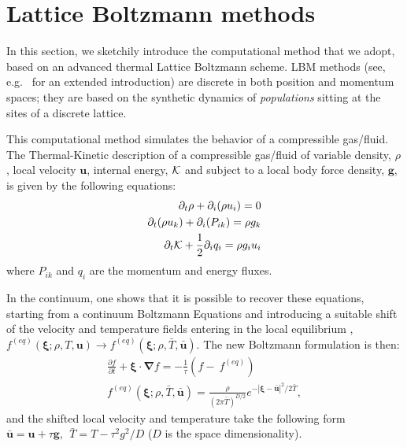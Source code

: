 \documentclass{elsarticle}
\newcommand{\T}{T}
\begin{document}

\section{Lattice Boltzmann methods}

In this section, we sketchily introduce the computational method that we adopt,
based on an advanced thermal Lattice Boltzmann scheme. LBM methods (see, e.g.~\cite{sauro} 
for an extended introduction) are discrete in
both position and momentum spaces; they are based on the synthetic dynamics of
{\em populations} sitting at the sites of a discrete lattice. 

This computational method simulates the behavior of a compressible
gas/fluid.
The Thermal-Kinetic description of a compressible gas/fluid of
variable density, $\rho$, local velocity ${\bm u }$, internal energy,
${\cal K}$ and subject to a local body force density, ${\bm g}$, is
given by the following equations:
\begin{eqnarray}
 \partial_t \rho + \partial_i (\rho u_i) = 0 \\ 
 \partial_t (\rho u_k) + \partial_i (P_{ik}) = \rho g_k \\
 \partial_t {\cal K} + \frac{1}{2} \partial_i q_i = \rho g_i u_i
\end{eqnarray}
where $P_{ik}$ and $q_i$ are the momentum and energy fluxes.

In the continuum, one shows that it is possible to recover these
equations, starting from a continuum Boltzmann Equations and introducing a
suitable shift of the velocity and temperature fields entering in the local
equilibrium \cite{JFM},
  $f^{(eq)}({\bm \xi}; \rho, T, {\bm u}) \rightarrow {
   f}^{(eq)}({\bm \xi}; \rho, {\bar T}, {\bm {\bar u}})$.  
The new Boltzmann formulation is then:
 \begin{eqnarray} 
 \label{MASTERSHIFT3} 
 \frac{\partial f }{\partial
     t}+{\bm \xi} \cdot {\bm \nabla} f=-\frac{1}{\tau}(f- {\
     f}^{(eq)})\;\\
     { f}^{(eq)}({\bm \xi}; \rho, \bar T, \bar
   {\bm u})=\frac{\rho}{(2 \pi {\bar T})^{D/2}} e^{-|{\bm \xi}- {\bm
       {\bar u}}|^2/2 {\bar T}},
\end{eqnarray}
and the shifted local velocity and temperature take the
 following form 
 $ \bar {\bm u} = {\bm u} + \tau {\bm g},~~ \bar T
 = \T - \tau^2 g^2/D$ ($D$ is the space dimensionality).
\end{document}
